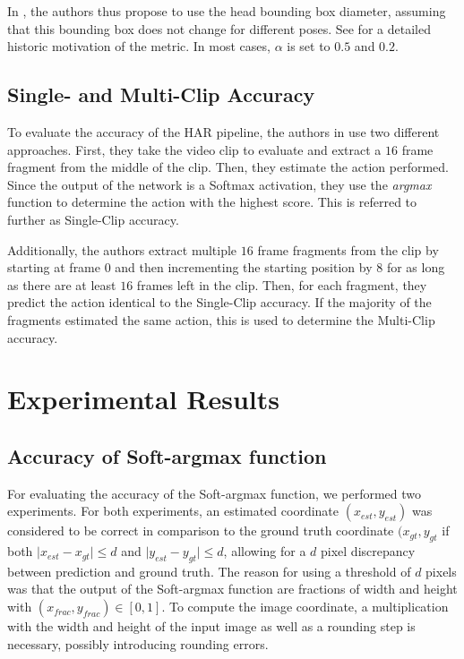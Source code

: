 In \cite{andriluka_2d_2014}, the authors thus propose to use the head bounding box diameter, assuming that this bounding box does not change for different poses.
See  for a detailed historic motivation of the metric.
In most cases, $\alpha$ is set to $0.5$ and $0.2$.

\subsection{Single- and Multi-Clip Accuracy}
To evaluate the accuracy of the HAR pipeline, the authors in \cite{luvizon_2d/3d_2018} use two different approaches.
First, they take the video clip to evaluate and extract a $16$ frame fragment from the middle of the clip.
Then, they estimate the action performed.
Since the output of the network is a Softmax activation, they use the \textit{argmax} function to determine the action with the highest score.
This is referred to further as Single-Clip accuracy.

Additionally, the authors extract multiple $16$ frame fragments from the clip by starting at frame $0$ and then incrementing the starting position by $8$ for as long as there are at least $16$ frames left in the clip.
Then, for each fragment, they predict the action identical to the Single-Clip accuracy.
If the majority of the fragments estimated the same action, this is used to determine the Multi-Clip accuracy. 

\section{Experimental Results}
\label{sec:exp-results}
\subsection{Accuracy of Soft-argmax function}
For evaluating the accuracy of the Soft-argmax function, we performed two experiments.
For both experiments, an estimated coordinate $(x_{est},y_{est})$ was considered to be correct in comparison to the ground truth coordinate $(x_{gt}, y_{gt}$ if both $\lvert x_{est} - x_{gt} \rvert \leq d$ and $\lvert y_{est} - y_{gt} \rvert \leq d$, allowing for a $d$ pixel discrepancy between prediction and ground truth.
The reason for using a threshold of $d$ pixels was that the output of the Soft-argmax function are fractions of width and height with $(x_{frac}, y_{frac}) \in [0,1]$.
To compute the image coordinate, a multiplication with the width and height of the input image as well as a rounding step is necessary, possibly introducing rounding errors.

